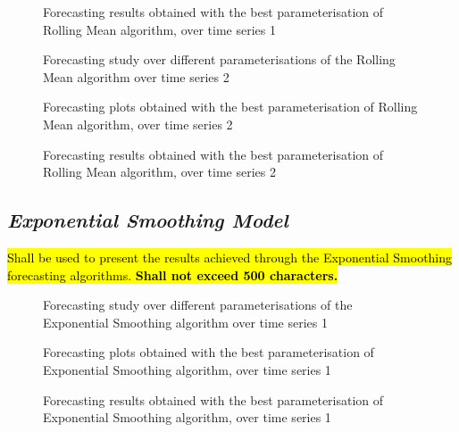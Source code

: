 \documentclass[10pt]{extarticle}
\newcommand{\ctext}[3][RGB]{%
  \begingroup
  \definecolor{hlcolor}{#1}{#2}\sethlcolor{hlcolor}%
  \hl{#3}%
  \endgroup
}
\begin{document}
\begin{figure}[H]
\caption{Forecasting results obtained with the best parameterisation of Rolling Mean algorithm, over time series 1}
\end{figure}

\begin{figure}[H]
\caption{Forecasting study over different parameterisations of the Rolling Mean algorithm over time series 2}
\end{figure}

\begin{figure}[H]
\caption{Forecasting plots obtained with the best parameterisation of Rolling Mean algorithm, over time series 2}
\end{figure}

\begin{figure}[H]
\caption{Forecasting results obtained with the best parameterisation of Rolling Mean algorithm, over time series 2}
\end{figure}

\subsection*{\textit{Exponential Smoothing Model}}
\ctext[RGB]{190,190,190}{Shall be used to present the results achieved through the Exponential Smoothing forecasting algorithms.  \textbf{Shall not exceed 500 characters.}}

\begin{figure}[H]
\caption{Forecasting study over different parameterisations of the Exponential Smoothing algorithm over time series 1}
\end{figure}

\begin{figure}[H]
\caption{Forecasting plots obtained with the best parameterisation of Exponential Smoothing algorithm, over time series 1}
\end{figure}

\begin{figure}[H]
\caption{Forecasting results obtained with the best parameterisation of Exponential Smoothing algorithm, over time series 1}
\end{figure}
\end{document}
